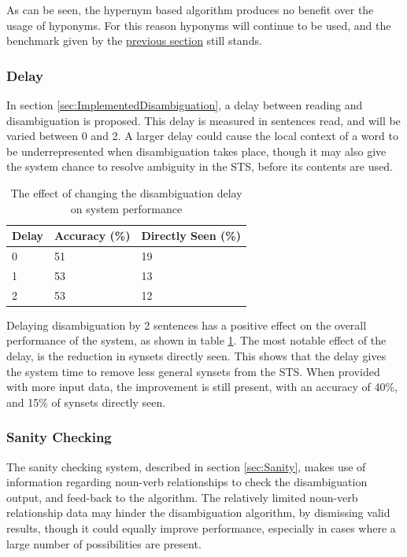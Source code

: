 \documentclass[]{article}
\begin{document}
As can be seen, the hypernym based algorithm produces no benefit over the usage of hyponyms. For this reason hyponyms will continue to be used, and the benchmark given by the \hyperref[sec:EvEpisodicBuffer]{previous section} still stands. 

\subsubsection{Delay}
\label{sec:EvDisDelay}
In section \ref{sec:ImplementedDisambiguation}, a delay between reading and disambiguation is proposed. This delay is measured in sentences read, and will be varied between 0 and 2. A larger delay could cause the local context of a word to be underrepresented when disambiguation takes place, though it may also give the system chance to resolve ambiguity in the STS, before its contents are used.

\begin{table}
\begin{center}
\begin{tabular}{|p{2em}|p{7em}|p{7em}|}
	\hline
	Delay & Accuracy (\%) & Directly Seen (\%) \\
	\hline
	0 & 51 & 19\\
	\hline
	1 & 53 & 13\\
	\hline
	2 & 53 & 12\\
	\hline
\end{tabular}
\end{center}
\caption{The effect of changing the disambiguation delay on system performance}
\label{table:Delay}
\end{table}

Delaying disambiguation by 2 sentences has a positive effect on the overall performance of the system, as shown in table \ref{table:Delay}. The most notable effect of the delay, is the reduction in synsets directly seen. This shows that the delay gives the system time to remove less general synsets from the STS. When provided with more input data, the improvement is still present, with an accuracy of 40\%, and 15\% of synsets directly seen.

\subsubsection{Sanity Checking} 
\label{sec:EvDisSanity}
The sanity checking system, described in section \ref{sec:Sanity}, makes use of information regarding noun-verb relationships to check the disambiguation output, and feed-back to the algorithm. The relatively limited noun-verb relationship data may hinder the disambiguation algorithm, by dismissing valid results, though it could equally improve performance, especially in cases where a large number of possibilities are present.
\end{document}
